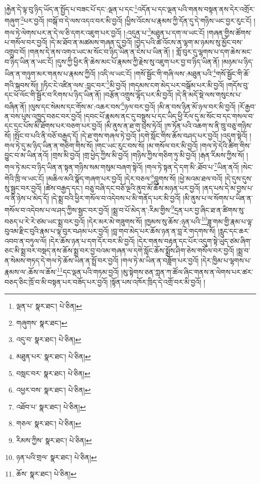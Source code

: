 །རྐྱེན་དེ་ལྟ་བུ་ཉིད་ཡོད་ན་སྤྱོད་པ་བཟང་པོ་དང་:ལྡན་པ་དང་\footnote{ལྡན་པ་  སྣར་ཐང་།  པེ་ཅིན། }འདོན་པ་དང་ལྡན་པའི་གནས་བསྟན་ནས་དེར་འགྲོར་གཞུག་\footnote{གཞུགས་  སྣར་ཐང་། }པར་བྱའོ། །བསྒོ་བ་དེ་ལས་འདའ་བར་མི་བྱའོ། །ཕྱིས་འོངས་པ་རྣམས་ཀྱི་དོན་དུ་དེ་གཉིས་ཡང་བྱར་རུང་ངོ། །གལ་ཏེ་ལེགས་པར་ན་དེ་ལ་ཅི་དགར་འཇུག་པར་བྱའོ། །:འདུན་པ་\footnote{འདུ་བ་  སྣར་ཐང་།  པེ་ཅིན། }མཐུན་པ་དག་ལ་ཡང་ངོ། །གཞན་གྱིས་ཚོགས་པ་གསོལ་བར་བྱའོ། །དེ་མ་ཐོབ་ན་མཚམས་གཞན་དུ་བྱའོ། །བྱེད་པའི་ཚེ་འོངས་ན་ལྷག་མ་ཉམས་སུ་མྱོང་བས་འགྲུབ་བོ། །གནས་དེ་ནས་འགའ་ཡང་མ་སོང་བ་ཉིད་ཡིན་ན་ངེས་པ་ཡིན་ནོ། །
གློ་བུར་དུ་ལྷགས་པ་དག་ཆེས་མང་བ་ཉིད་ཡིན་ན་ཡང་ངོ། །དུས་ཀྱི་ཕྱིར་ནི་ཆེས་མང་པོ་རྣམས་ཀྱི་རྗེས་སུ་འཇུག་པར་བྱ་བ་ཉིད་ཡིན་ནོ། །མཉམ་པ་ཉིད་ཡིན་ན་གཉུག་མར་གནས་པ་རྣམས་ཀྱིའོ། །འདི་ལ་ཡང་ངོ། །གསོ་སྦྱོང་གི་གཞི་ལས་:མཐུན་པའི་\footnote{མཐུན་པར་  སྣར་ཐང་།  པེ་ཅིན། }གསོ་སྦྱོང་གི་ཆོ་གའི་སྐབས་སོ།། །།ཏིང་ངེ་འཛིན་ལས་:བླང་བར་\footnote{བསླང་བར་  སྣར་ཐང་།  པེ་ཅིན། }མི་བྱའོ། །གདམས་ངག་མེད་པར་བསྒོམ་པར་མི་བྱའོ། །གདོས་བུ་དང་ཕོ་ལོང་གི་སྦྱོར་བ་རིགས་པ་ཉིད་ཡིན་ནོ། །བརྩོན་འགྲུས་ལྷོད་པར་མི་བྱའོ། །དེ་ནི་མདོ་སྡེ་ལས་གསུངས་པ་བཞིན་ནོ། །ལུས་དང་སེམས་དང་གོས་མ་:འཆར་བས་\footnote{འཕྱར་བས་  སྣར་ཐང་།  པེ་ཅིན། }ཉལ་བར་བྱའོ། །མི་ན་བས་ཉིན་མོ་ཉལ་བར་མི་བྱའོ། །རོ་རྒྱབ་ན་བས་པུས་འཁྱུད་བཅང་བར་བྱའོ། །དབང་པོ་རྣམས་ནང་དུ་བསྡུས་པ་དང་ཡིད་ཕྱི་རོལ་དུ་མ་སོང་བ་དང་གསལ་བ་དང་དྲང་པོས་མི་ཐོགས་པར་བཅག་པར་བྱའོ། །མི་ནུས་ན་ཐ་གུ་བྲེས་ཏེའོ། །ཁ་ཏོན་པའི་འཆག་ས་ནི་ཁྲུ་བཅུ་གཉིས་སོ། །སྤོང་བ་པའི་ནི་བཅོ་བརྒྱད་དོ། །དེ་ཐ་གུས་གཞལ་ཏེ་བྱའོ། །དགེ་སློང་གིས་ཆོས་བཤད་པར་བྱའོ། །འདུག་སྟེའོ། །གལ་ཏེ་དུ་མ་ཉིད་ཡིན་ན་གཅིག་གིས་སོ། །གང་ཡང་རུང་བས་སོ། །མ་གསོལ་བར་མི་བྱའོ། །གལ་ཏེ་དེའི་ཚིག་གིས་བྱུང་བ་མ་ཡིན་ནའོ། །གྲས་མི་བྱའོ། །གྲ་ཕྱེད་ཀྱིས་མི་བྱའོ། །གཉིས་ཀྱིས་གཅིག་ཏུ་མི་བྱའོ། །རྒན་རིམས་ཀྱིས་སོ། །གལ་ཏེ་མང་བ་ཉིད་ཡིན་ན་སྟན་གཉིས་སམ་གསུམ་བཞག་སྟེའོ། །གལ་ཏེ་སྟན་དེ་དག་མི་:ཐོབ་པ་\footnote{འཐོབ་པ་  སྣར་ཐང་།  པེ་ཅིན། }ཡིན་ནའོ། །སེང་གེའི་ཁྲི་ལ་ཡང་ངོ། །མཆིལ་མའི་སྣོད་གཞག་པར་བྱའོ། །དེར་བཅལ་\footnote{གཅལ་  སྣར་ཐང་།  པེ་ཅིན། }བླུགས་སོ། །ཕྱེ་མའམ་ཐལ་བའོ། །དེ་དུས་དུས་སུ་སྦྱང་བར་བྱའོ། །ཚེས་བརྒྱད་དང་། བཅུ་བཞི་དང་བཅོ་ལྔའི་ནུབ་མོ་ཆོས་མཉན་པར་བྱའོ། །ནད་པས་དེ་མ་བྱས་པ་ལ་ནི་ཉེས་པ་མེད་དོ། །དེ་སྨྲ་བའི་ཕྱིར་གསོལ་བ་འདེབས་པ་མི་གནོད་པར་མི་བྱའོ། །མི་ནུས་པ་ལ་སོགས་པ་ཡིན་ན་གསོལ་བ་འདེབས་པ་ལ་ཤད་ཀྱིས་སྦྱང་བར་བྱའོ། །སྨྲ་བ་པོ་མེད་ན་:རིམ་གྱིས་\footnote{རིམས་ཀྱིས་  སྣར་ཐང་།  པེ་ཅིན། }དྲན་པར་བྱ་ཞིང་ཐ་ན་ཚིགས་སུ་བཅད་པ་རེ་རེ་ཙམ་ཡང་སྨྲ་བར་བྱའོ། །དེར་མར་མེ་གཟུགས་སོ། །ཁྱམས་སུ་ཆོས་:ཉན་པའི་\footnote{ཉན་པའི་གྲལ་  སྣར་ཐང་།  པེ་ཅིན། }ཟླ་གམ་གྱི་རྣམ་པ་ལྟ་བུའམ་རྫིང་བུའི་རྣམ་པ་ལྟ་བུར་བཤམ་པར་བྱའོ། །བླ་གབ་མེད་པར་ཆོས་ཉན་ན་བླ་རེ་གདགས་སོ། །རླུང་དང་ཆར་འབབ་ན་བཏུལ་ལོ། །དེར་ཆོས་ཉན་པ་དག་དོར་བར་མི་བྱའོ། །དེར་གནས་བརྟན་དང་པོར་འདུག་སྟེ་ཡུད་ཙམ་ཞིག་ཅང་མི་སྨྲ་བར་བསྡད་ནས་ཆོས་སྨྲ་བར་བྱ་བའམ་གཞན་ལ་དགེ་སློང་ཆོས་སྨྲོས་ཤིག་ཅེས་གསོལ་བར་བྱའོ། །སྨྲ་བ་ན་སེམས་གཏད་དེ་གལ་ཏེ་ཆོས་ཡིན་ན་སྤྲོ་བར་བྱའོ། །གལ་ཏེ་མ་ཡིན་ན་བཟློག་པར་བྱའོ། །དེར་ཁྱིམ་པ་ལྷགས་པ་རྣམས་ལ་:ཆོས་ལ་ཆོས་\footnote{ཆོས་  སྣར་ཐང་།  པེ་ཅིན། }དང་ལྡན་པའི་གཏམ་བྱའོ། །མུ་སྟེགས་ཅན་ཀླན་ཀ་ཚོལ་ཞིང་གནས་ན་ལེགས་པར་ཚར་བཅད་ཅིང་ཁྲོ་བ་མི་བསྟན་པར་བཟོད་པར་བྱའོ། །སྟོན་པས་འཁོར་ཁྲིད་དེ་འགྲོ་བར་མི་བྱའོ། །
